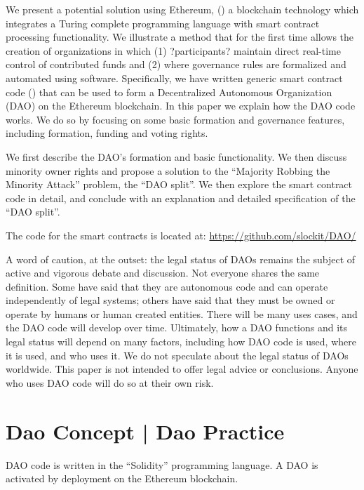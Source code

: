 \documentclass[9pt,oneside]{amsart}
\begin{document}
\begin{multicols}{2}
We present a potential solution using Ethereum, (\cite{buterin2013ethereum,Wood2014ethereum}) a blockchain technology which integrates a Turing complete programming language with smart contract processing functionality.  We illustrate a method that for the first time allows the creation of organizations in which (1) ?participants?  maintain direct real-time control of contributed funds and (2) where governance rules are formalized and automated using software.  Specifically, we have written generic smart contract code (\cite{szabo1997formalizing, miller1997future}) that can be used to form a Decentralized Autonomous Organization (DAO) on the Ethereum blockchain. In this paper we explain how the DAO code works.  We do so by focusing on some basic formation and governance features, including formation, funding and voting rights.

We first describe the DAO's formation and basic functionality.  We then discuss minority owner rights and propose a solution to the ``Majority Robbing the Minority Attack'' problem, the ``DAO split''. We then explore the smart contract code in detail, and conclude with an explanation and detailed specification of the ``DAO split''.

The code for the smart contracts is located at: \url{https://github.com/slockit/DAO/}

A word of caution, at the outset:  the legal status of DAOs remains the subject of active and vigorous debate and discussion.  Not everyone shares the same definition.  Some have said that they are autonomous code and can operate independently of legal systems; others have said that they must be owned or operate by humans or human created entities. There will be many uses cases, and the DAO code will develop over time.  Ultimately, how a DAO functions and its legal status will depend on many factors, including how DAO code is used, where it is used, and who uses it.  We do not speculate about the legal status of DAOs worldwide.  This paper is not intended to offer legal advice or conclusions.  Anyone who uses DAO code will do so at their own risk.



\section{Dao Concept | Dao Practice}

DAO code is written in the ``Solidity'' programming language.  A DAO is activated by deployment on the Ethereum blockchain.  


\end{multicols}
\end{document}
